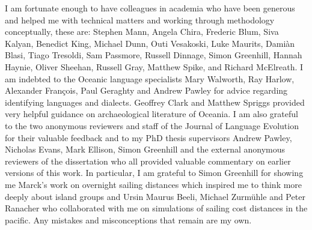 I am fortunate enough to have colleagues in academia who have been generous and helped me with technical matters and working through methodology conceptually, these are: Stephen Mann, Angela Chira, Frederic Blum, Siva Kalyan, Benedict King, Michael Dunn, Outi Vesakoski, Luke Maurits, Damiàn Blasi, Tiago Tresoldi, Sam Passmore, Russell Dinnage, Simon Greenhill, Hannah Haynie, Oliver Sheehan, Russell Gray, Matthew Spike, and Richard McElreath. I am indebted to the Oceanic language specialists Mary Walworth, Ray Harlow, Alexander François, Paul Geraghty and Andrew Pawley for advice regarding identifying languages and dialects. Geoffrey Clark and Matthew Spriggs provided very helpful guidance on archaeological literature of Oceania. I am also grateful to the two anonymous reviewers and staff of the Journal of Language Evolution for their valuable feedback and to my PhD thesis supervisors Andrew Pawley, Nicholas Evans, Mark Ellison, Simon Greenhill and the external anonymous reviewers of the dissertation who all provided valuable commentary on earlier versions of this work. In particular, I am grateful to Simon Greenhill for showing me Marck's work on overnight sailing distances which inspired me to think more deeply about island groups and  Ursin Maurus Beeli, Michael Zurmühle and Peter Ranacher who collaborated with me on simulations of sailing cost distances in the pacific. Any mistakes and misconceptions that remain are my own.

